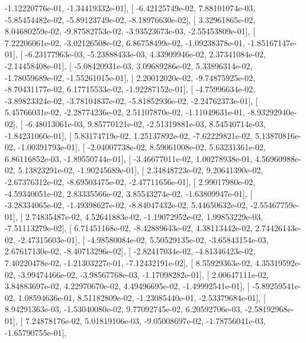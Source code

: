 \documentclass{article}
\begin{document}
         -1.12220776e-01,  -1.34419332e-01],
       [ -6.42125749e-02,   7.88101074e-03,  -5.85454482e-02,
         -5.89123749e-02,  -8.18976630e-02],
       [  3.32961865e-02,   8.04680259e-02,  -9.87582753e-02,
         -3.93523673e-03,  -2.55453809e-01],
       [  7.22206061e-02,  -3.02126508e-02,   6.86758499e-02,
         -1.09238378e-01,  -1.85167147e-01],
       [ -6.23177963e-03,  -5.23888433e-03,   4.33909946e-02,
          2.37341084e-02,  -2.14458408e-01],
       [ -5.08420931e-03,   3.09689286e-02,   5.33896314e-02,
         -1.78059689e-02,  -1.55261015e-01],
       [  2.20012020e-02,  -9.74875925e-02,  -8.70431177e-02,
          6.17715533e-02,  -1.92287152e-01],
       [ -4.75996634e-02,  -3.89823324e-02,  -3.78104837e-02,
         -5.81852936e-02,  -2.24762373e-01],
       [  5.45766031e-02,  -2.28774236e-02,   2.51107870e-02,
         -1.11049631e-01,  -8.93292940e-02],
       [ -6.48013061e-03,   9.85770121e-02,  -2.51319881e-03,
          8.54540714e-03,  -1.84231060e-01],
       [  5.83174719e-02,   1.25137892e-02,  -7.62229821e-02,
          5.13870816e-02,  -1.00391793e-01],
       [ -2.04007738e-02,   8.59061008e-02,   5.63231361e-02,
          6.86116852e-03,  -1.89550744e-01],
       [ -3.46677011e-02,   1.00278938e-01,   4.56960988e-02,
          5.13823291e-02,  -1.90245689e-01],
       [  2.34848723e-02,   9.20641390e-02,  -2.67376312e-02,
         -8.69503475e-02,  -2.47711656e-01],
       [  2.99017980e-02,  -4.59340051e-02,   2.83335566e-02,
          3.85543274e-02,  -1.63809947e-01],
       [ -3.28334065e-02,  -1.49398627e-02,  -8.84047432e-02,
          5.44650632e-02,  -2.55467759e-01],
       [  2.74835487e-02,   4.52641883e-02,  -1.19072952e-02,
          1.99853229e-03,  -7.51113279e-02],
       [  6.71451168e-02,  -8.42889643e-02,   4.38113442e-02,
          2.74426143e-02,  -2.47315603e-01],
       [ -4.98580084e-02,   5.50529135e-02,  -3.65843154e-03,
          2.67617130e-02,  -8.40713296e-02],
       [ -2.82417034e-02,  -4.81346423e-02,   7.40220478e-02,
         -1.21303227e-01,  -7.12432191e-02],
       [  8.55929363e-02,   4.35319592e-02,  -3.99474466e-02,
         -3.98567768e-03,  -1.17098282e-01],
       [  2.00647111e-02,   3.84883697e-02,   4.22970670e-02,
          4.49496695e-02,  -1.49992541e-01],
       [ -5.89259541e-02,   1.08594636e-01,   8.51182809e-02,
         -1.23085440e-01,  -2.53379684e-01],
       [  8.94291363e-03,  -1.53040080e-02,   9.77092745e-02,
          6.20592706e-03,  -2.58192968e-01],
       [  7.24878176e-02,   5.01819106e-03,  -9.05008697e-02,
         -1.78756041e-03,  -1.65790755e-01],
\end{document}
